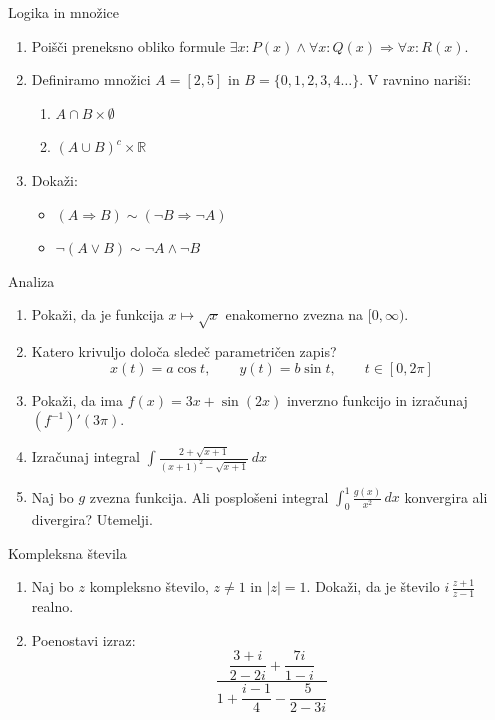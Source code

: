 \begin{frame}{Logika in množice}
	\begin{enumerate}
		\item
		Poišči preneksno obliko formule $\exists x: P(x) \land \forall x: Q(x) \Rightarrow \forall x: R(x)$. 
		\item 
		Definiramo množici $A=[2, 5]$ in $B=\{0,1,2,3,4\ldots\}$.
		V ravnino nariši:
		\begin{enumerate}
		   \item $A \cap B \times \emptyset$
		   \item $(A \cup B)^c \times \mathbb{R}$
		\end{enumerate}
		\item
		Dokaži:
		\begin{itemize}
			\item $(A \Rightarrow B) \sim (\lnot B \Rightarrow \lnot A)$
			\item $\lnot(A \lor B) \sim \lnot A \land \lnot B$
		\end{itemize}
	\end{enumerate}
\end{frame}

\begin{frame}{Analiza}
	\begin{enumerate}
		\item
		Pokaži, da je funkcija $x \mapsto \sqrt{x}$ enakomerno zvezna na $[0, \infty)$.
		\item 
		Katero krivuljo določa sledeč parametričen zapis?
		$$
		   x(t) = a \cos t, \qquad %
		   y(t) = b \sin t, \qquad %
		   t \in [0, 2 \pi]
		$$ 
		\item
		Pokaži, da ima $f(x)=3x+\sin(2x)$ inverzno funkcijo in izračunaj $(f^{-1})'(3 \pi)$.
		
		\item
		Izračunaj integral 
		$ \displaystyle \int \frac{2+\sqrt{x+1}}{(x+1)^2-\sqrt{x+1}} \, dx$
		\item 
		Naj bo $g$ zvezna funkcija. Ali posplošeni integral 
		$ \int_0^1 \frac{g(x)}{x^2} \, dx$
		konvergira ali divergira? Utemelji.
	\end{enumerate}
\end{frame}

\begin{frame}{Kompleksna števila}
	\begin{enumerate}
		\item
		Naj bo $z$ kompleksno število, $z \ne 1$ in $|z|=1$.
		Dokaži, da je število \( i \, \frac{z+1}{z-1} \) realno.
		\item
		Poenostavi izraz:
		$$ 
		  \frac{\dfrac{3+i}{2-2i}+\dfrac{7i}{1-i}}{1+\dfrac{i-1}{4}-\dfrac{5}{2-3i}}
		$$
	\end{enumerate}
\end{frame}